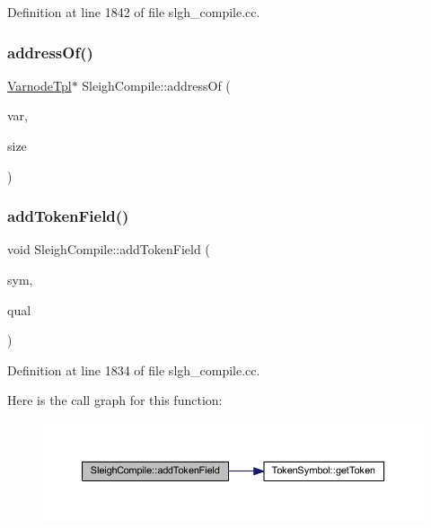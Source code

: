 Definition at line 1842 of file slgh\+\_\+compile.\+cc.

\mbox{\label{class_sleigh_compile_a5c736771ead9a6bec61df50946f98de8}} 
\subsubsection{\texorpdfstring{addressOf()}{addressOf()}}
{\footnotesize\ttfamily \mbox{\hyperlink{class_varnode_tpl}{Varnode\+Tpl}}$\ast$ Sleigh\+Compile\+::address\+Of (\begin{DoxyParamCaption}\item[{\mbox{\hyperlink{class_varnode_tpl}{Varnode\+Tpl}} $\ast$}]{var,  }\item[{uint4}]{size }\end{DoxyParamCaption})}

\mbox{\label{class_sleigh_compile_a5c22093ca6485e902e05da5df71d651a}} 
\subsubsection{\texorpdfstring{addTokenField()}{addTokenField()}}
{\footnotesize\ttfamily void Sleigh\+Compile\+::add\+Token\+Field (\begin{DoxyParamCaption}\item[{\mbox{\hyperlink{class_token_symbol}{Token\+Symbol}} $\ast$}]{sym,  }\item[{\mbox{\hyperlink{struct_field_quality}{Field\+Quality}} $\ast$}]{qual }\end{DoxyParamCaption})}



Definition at line 1834 of file slgh\+\_\+compile.\+cc.

Here is the call graph for this function\+:
\nopagebreak
\begin{figure}[H]
\begin{center}
\leavevmode
\includegraphics[width=350pt]{class_sleigh_compile_a5c22093ca6485e902e05da5df71d651a_cgraph}
\end{center}
\end{figure}
\mbox{\label{class_sleigh_compile_ab5e2aa6387dbb75df28a3418665cdd51}} 
